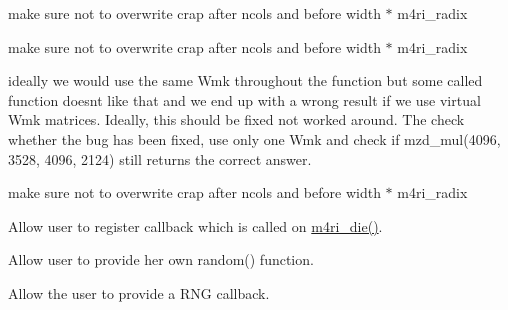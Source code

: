 
\begin{DoxyRefList}
\item[\label{todo__todo000012}%
\hypertarget{todo__todo000012}{}%
global\+Scope$>$ Member \hyperlink{strassen_8h_a6ad9c4c4d3ab2ec65f610a17d66cebb0}{\+\_\+mzd\+\_\+addmul\+\_\+even} (\hyperlink{structmzd__t}{mzd\+\_\+t} $\ast$\+C, \hyperlink{structmzd__t}{mzd\+\_\+t} const $\ast$\+A, \hyperlink{structmzd__t}{mzd\+\_\+t} const $\ast$\+B, int cutoff)]make sure not to overwrite crap after ncols and before width $\ast$ m4ri\+\_\+radix  
\item[\label{todo__todo000008}%
\hypertarget{todo__todo000008}{}%
global\+Scope$>$ Member \hyperlink{mp_8h_a84636c233f0fa37354c6670bd3af72f0}{\+\_\+mzd\+\_\+addmul\+\_\+mp4} (\hyperlink{structmzd__t}{mzd\+\_\+t} $\ast$\+C, \hyperlink{structmzd__t}{mzd\+\_\+t} const $\ast$\+A, \hyperlink{structmzd__t}{mzd\+\_\+t} const $\ast$\+B, int cutoff)]make sure not to overwrite crap after ncols and before width $\ast$ m4ri\+\_\+radix  
\item[\label{todo__todo000011}%
\hypertarget{todo__todo000011}{}%
global\+Scope$>$ Member \hyperlink{strassen_8h_a8432a43d231b2aeaf118d21b35d817ce}{\+\_\+mzd\+\_\+mul\+\_\+even} (\hyperlink{structmzd__t}{mzd\+\_\+t} $\ast$\+C, \hyperlink{structmzd__t}{mzd\+\_\+t} const $\ast$\+A, \hyperlink{structmzd__t}{mzd\+\_\+t} const $\ast$\+B, int cutoff)]ideally we would use the same Wmk throughout the function but some called function doesn\textquotesingle{}t like that and we end up with a wrong result if we use virtual Wmk matrices. Ideally, this should be fixed not worked around. The check whether the bug has been fixed, use only one Wmk and check if mzd\+\_\+mul(4096, 3528, 4096, 2124) still returns the correct answer.  
\item[\label{todo__todo000009}%
\hypertarget{todo__todo000009}{}%
global\+Scope$>$ Member \hyperlink{mp_8h_ab19af18c2e870e38a4d4c7c4ee4eb32b}{\+\_\+mzd\+\_\+mul\+\_\+mp4} (\hyperlink{structmzd__t}{mzd\+\_\+t} $\ast$\+C, \hyperlink{structmzd__t}{mzd\+\_\+t} const $\ast$\+A, \hyperlink{structmzd__t}{mzd\+\_\+t} const $\ast$\+B, int cutoff)]make sure not to overwrite crap after ncols and before width $\ast$ m4ri\+\_\+radix  
\item[\label{todo__todo000001}%
\hypertarget{todo__todo000001}{}%
global\+Scope$>$ Member \hyperlink{misc_8h_a99247474582ef8ad10ddabd2be39af61}{m4ri\+\_\+die} (const char $\ast$errormessage,...)]Allow user to register callback which is called on \hyperlink{misc_8h_a99247474582ef8ad10ddabd2be39af61}{m4ri\+\_\+die()}. 
\item[\label{todo__todo000003}%
\hypertarget{todo__todo000003}{}%
global\+Scope$>$ Member \hyperlink{misc_8h_acfff993c60874755b199fec125de613a}{m4ri\+\_\+random\+\_\+word} ()]Allow user to provide her own random() function.  
\item[\label{todo__todo000010}%
\hypertarget{todo__todo000010}{}%
global\+Scope$>$ Member \hyperlink{mzd_8h_a3167fa0d3b20f8a707e1aa98562be7fa}{mzd\+\_\+randomize} (\hyperlink{structmzd__t}{mzd\+\_\+t} $\ast$\+M)]Allow the user to provide a R\+N\+G callback. 
\end{DoxyRefList}